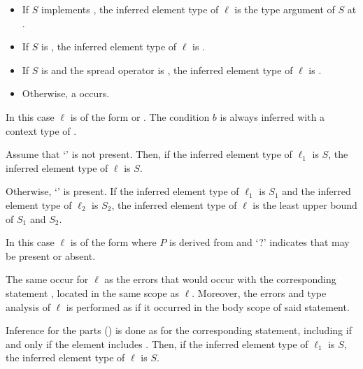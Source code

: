 \documentclass[makeidx]{article}
\begin{document}
{\begin{itemize}
\item
  If $S$ implements ,
  the inferred element type of $\ell$ is
  the type argument of $S$ at .
\item
  If $S$ is \DYNAMIC,
  the inferred element type of $\ell$ is \DYNAMIC.
\item
  If $S$ is  and the spread operator is ,
  the inferred element type of $\ell$ is .
\item
  Otherwise, a  occurs.
\end{itemize}
\vspace{-5mm}
\EndCase

\LMHash{}%
In this case $\ell$ is of the form
 or
.
The condition $b$ is always inferred with a context type of .

Assume that `' is not present.
Then, if the inferred element type of $\ell_1$ is $S$,
the inferred element type of $\ell$ is $S$.

Otherwise, `' is present.
If the inferred element type of $\ell_1$ is $S_1$ and
the inferred element type of $\ell_2$ is $S_2$,
the inferred element type of $\ell$ is
the least upper bound of $S_1$ and $S_2$.
\EndCase

\LMHash{}%
In this case $\ell$ is of the form
where $P$ is derived from  and
`\AWAIT?' indicates that \AWAIT{} may be present or absent.

The same  occur for $\ell$ as
the errors that would occur with the corresponding \FOR{} statement
,
located in the same scope as $\ell$.
Moreover, the errors and type analysis of $\ell$ is performed
as if it occurred in the body scope of said \FOR{} statement.

Inference for the parts
()
is done as for the corresponding \FOR{} statement,
including \AWAIT{} if and only if the element includes \AWAIT.
Then, if the inferred element type of $\ell_1$ is $S$,
the inferred element type of $\ell$ is $S$.

}
\end{document}
